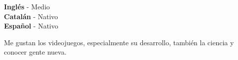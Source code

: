 \documentclass[9pt]{developercv} %
\begin{document}
\begin{minipage}[t]{0.3\textwidth}
	\vspace{-\baselineskip} %


	\textbf{Inglés} - Medio\\
	\textbf{Catalán} - Nativo\\
	\textbf{Español} - Nativo\\
\end{minipage}
\hfill
\begin{minipage}[t]{0.3\textwidth}
	\vspace{-\baselineskip} %


	Me gustan los videojuegos, especialmente su desarrollo, también la ciencia y conocer gente nueva.

\end{minipage}
\hfill

\end{document}
